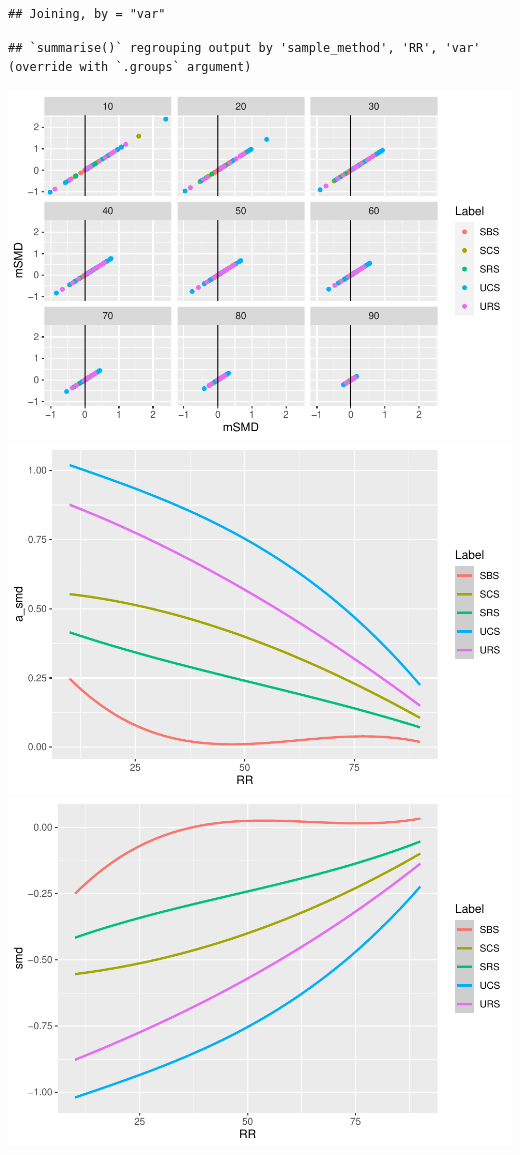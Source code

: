 \documentclass[
  english,
  man,floatsintext]{apa6}
\begin{document}
\begin{verbatim}
## Joining, by = "var"
\end{verbatim}

\begin{verbatim}
## `summarise()` regrouping output by 'sample_method', 'RR', 'var' (override with `.groups` argument)
\end{verbatim}

\includegraphics{5---Analysis_files/figure-latex/unnamed-chunk-29-1.pdf} \includegraphics{5---Analysis_files/figure-latex/unnamed-chunk-29-2.pdf} \includegraphics{5---Analysis_files/figure-latex/unnamed-chunk-29-3.pdf}
\end{document}

